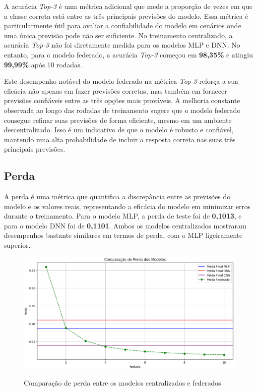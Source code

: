 A acurácia \textit{Top-3} é uma métrica adicional que mede a proporção de vezes em que a classe correta está entre as três principais previsões do modelo. Essa métrica é particularmente útil para avaliar a confiabilidade do modelo em cenários onde uma única previsão pode não ser suficiente. No treinamento centralizado, a acurácia \textit{Top-3} não foi diretamente medida para os modelos MLP e DNN. No entanto, para o modelo federado, a acurácia \textit{Top-3} começou em \textbf{98,35\%} e atingiu \textbf{99,99\%} após 10 rodadas.

Este desempenho notável do modelo federado na métrica \textit{Top-3} reforça a sua eficácia não apenas em fazer previsões corretas, mas também em fornecer previsões confiáveis entre as três opções mais prováveis. A melhoria constante observada ao longo das rodadas de treinamento sugere que o modelo federado consegue refinar suas previsões de forma eficiente, mesmo em um ambiente descentralizado. Isso é um indicativo de que o modelo é robusto e confiável, mantendo uma alta probabilidade de incluir a resposta correta nas suas três principais previsões.

\subsection{Perda}

A perda é uma métrica que quantifica a discrepância entre as previsões do modelo e os valores reais, representando a eficácia do modelo em minimizar erros durante o treinamento. Para o modelo MLP, a perda de teste foi de \textbf{0,1013}, e para o modelo DNN foi de \textbf{0,1101}. Ambos os modelos centralizados mostraram desempenhos bastante similares em termos de perda, com o MLP ligeiramente superior.

\begin{figure}[ht]
    \centering
    \caption{Comparação de perda entre os modelos centralizados e federados}
    \includegraphics[scale=0.4]{figuras/analiseResultados/lossComparison.eps}
    \label{fig:lossComparison}
\end{figure}


